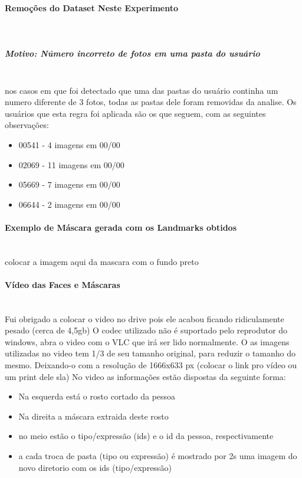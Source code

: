 \paragraph{Remoções do Dataset Neste Experimento}\mbox{}\\
\subparagraph{Motivo: Número incorreto de fotos em uma pasta do usuário}\mbox{}\\
nos casos em que foi detectado que uma das pastas do usuário continha um numero diferente de 3 fotos, todas as pastas dele foram removidas da analise. Os usuários que esta regra foi aplicada são os que seguem, com as seguintes observações:
\begin{itemize}
    \item{00541 - 4 imagens em 00/00}
    \item{02069 - 11 imagens em 00/00}
    \item{05669 - 7 imagens em 00/00}
    \item{06644 - 2 imagens em 00/00}
\end{itemize}

\paragraph{Exemplo de Máscara gerada com os Landmarks obtidos}\mbox{}\\
colocar a imagem aqui da mascara com o fundo preto

\paragraph{Vídeo das Faces e Máscaras}\mbox{}\\
Fui obrigado a colocar o video no drive pois ele acabou ficando ridiculamente pesado (cerca de 4,5gb) O codec utilizado não é suportado pelo reprodutor do windows, abra o video com o VLC que irá ser lido normalmente. O as imagens utilizadas no video tem 1/3 de seu tamanho original, para reduzir o tamanho do mesmo. Deixando-o com a resolução de 1666x633 px
(colocar o link pro vídeo ou um print dele sla)
No video as informações estão dispostas da seguinte forma:

\begin{itemize}
    \item{Na esquerda está o rosto cortado da pessoa}
    \item{Na direita a máscara extraida deste rosto}
    \item{no meio estão o tipo/expressão (ids) e o id da pessoa, respectivamente}
    \item{a cada troca de pasta (tipo ou expressão) é mostrado por 2s uma imagem do novo diretorio com os ids (tipo/expressão)}
\end{itemize}


